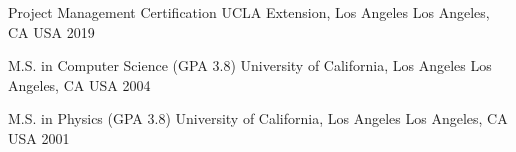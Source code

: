 

\begin{cventries}


 \cventry
    {Project Management Certification} %
    {UCLA Extension, Los Angeles} %
    {Los Angeles, CA USA} %
    {2019} %
    {}


  \cventry
    {M.S. in Computer Science (GPA 3.8)} %
    {University of California, Los Angeles} %
    {Los Angeles, CA USA} %
    {2004} %
    {}

   \cventry
    {M.S. in Physics (GPA 3.8)} %
    {University of California, Los Angeles} %
    {Los Angeles, CA USA} %
    {2001} %
    {}	
	


\end{cventries}
